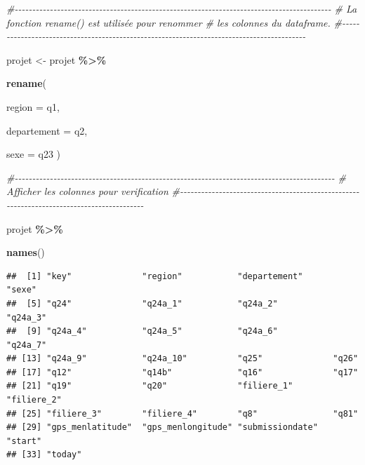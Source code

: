 \documentclass[
]{article}
\newenvironment{Shaded}{\begin{snugshade}}{\end{snugshade}}
\newcommand{\AttributeTok}[1]{\textcolor[rgb]{0.13,0.29,0.53}{#1}}
\newcommand{\CommentTok}[1]{\textcolor[rgb]{0.56,0.35,0.01}{\textit{#1}}}
\newcommand{\FunctionTok}[1]{\textcolor[rgb]{0.13,0.29,0.53}{\textbf{#1}}}
\newcommand{\NormalTok}[1]{#1}
\newcommand{\OtherTok}[1]{\textcolor[rgb]{0.56,0.35,0.01}{#1}}
\newcommand{\SpecialCharTok}[1]{\textcolor[rgb]{0.81,0.36,0.00}{\textbf{#1}}}
\begin{document}
\begin{Shaded}
\begin{Highlighting}[]
\CommentTok{\#{-}{-}{-}{-}{-}{-}{-}{-}{-}{-}{-}{-}{-}{-}{-}{-}{-}{-}{-}{-}{-}{-}{-}{-}{-}{-}{-}{-}{-}{-}{-}{-}{-}{-}{-}{-}{-}{-}{-}{-}{-}{-}{-}{-}{-}{-}{-}{-}{-}{-}{-}{-}{-}{-}{-}{-}{-}{-}{-}{-}{-}{-}{-}{-}{-}{-}{-}{-}{-}{-}{-}{-}{-}{-}{-}{-}{-}{-}{-}{-}{-}{-}{-}{-}{-}{-}{-}{-}{-}{-}}
\CommentTok{\#     La fonction rename() est utilisée pour renommer         }
\CommentTok{\#           les colonnes du dataframe.                        }
\CommentTok{\#{-}{-}{-}{-}{-}{-}{-}{-}{-}{-}{-}{-}{-}{-}{-}{-}{-}{-}{-}{-}{-}{-}{-}{-}{-}{-}{-}{-}{-}{-}{-}{-}{-}{-}{-}{-}{-}{-}{-}{-}{-}{-}{-}{-}{-}{-}{-}{-}{-}{-}{-}{-}{-}{-}{-}{-}{-}{-}{-}{-}{-}{-}{-}{-}{-}{-}{-}{-}{-}{-}{-}{-}{-}{-}{-}{-}{-}{-}{-}{-}{-}{-}{-}{-}{-}{-}{-}{-}{-}{-}}

\NormalTok{projet }\OtherTok{\textless{}{-}}\NormalTok{ projet }\SpecialCharTok{\%\textgreater{}\%}
  
  \FunctionTok{rename}\NormalTok{(}
    
    \AttributeTok{region =}\NormalTok{ q1,}
         
       \AttributeTok{departement =}\NormalTok{ q2,}
       
       \AttributeTok{sexe =}\NormalTok{ q23}
\NormalTok{    )}

\CommentTok{\#{-}{-}{-}{-}{-}{-}{-}{-}{-}{-}{-}{-}{-}{-}{-}{-}{-}{-}{-}{-}{-}{-}{-}{-}{-}{-}{-}{-}{-}{-}{-}{-}{-}{-}{-}{-}{-}{-}{-}{-}{-}{-}{-}{-}{-}{-}{-}{-}{-}{-}{-}{-}{-}{-}{-}{-}{-}{-}{-}{-}{-}{-}{-}{-}{-}{-}{-}{-}{-}{-}{-}{-}{-}{-}{-}{-}{-}{-}{-}{-}{-}{-}{-}{-}{-}{-}{-}{-}{-}{-}{-}}
\CommentTok{\#     Afficher les colonnes pour verification}
\CommentTok{\#{-}{-}{-}{-}{-}{-}{-}{-}{-}{-}{-}{-}{-}{-}{-}{-}{-}{-}{-}{-}{-}{-}{-}{-}{-}{-}{-}{-}{-}{-}{-}{-}{-}{-}{-}{-}{-}{-}{-}{-}{-}{-}{-}{-}{-}{-}{-}{-}{-}{-}{-}{-}{-}{-}{-}{-}{-}{-}{-}{-}{-}{-}{-}{-}{-}{-}{-}{-}{-}{-}{-}{-}{-}{-}{-}{-}{-}{-}{-}{-}{-}{-}{-}{-}{-}{-}{-}{-}{-}{-}}

\NormalTok{projet }\SpecialCharTok{\%\textgreater{}\%}
  
  \FunctionTok{names}\NormalTok{()}
\end{Highlighting}
\end{Shaded}

\begin{verbatim}
##  [1] "key"              "region"           "departement"      "sexe"            
##  [5] "q24"              "q24a_1"           "q24a_2"           "q24a_3"          
##  [9] "q24a_4"           "q24a_5"           "q24a_6"           "q24a_7"          
## [13] "q24a_9"           "q24a_10"          "q25"              "q26"             
## [17] "q12"              "q14b"             "q16"              "q17"             
## [21] "q19"              "q20"              "filiere_1"        "filiere_2"       
## [25] "filiere_3"        "filiere_4"        "q8"               "q81"             
## [29] "gps_menlatitude"  "gps_menlongitude" "submissiondate"   "start"           
## [33] "today"
\end{verbatim}
\end{document}

